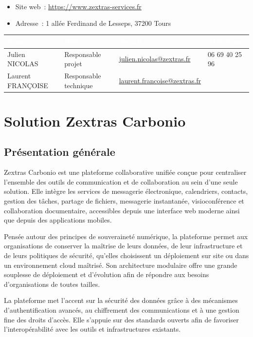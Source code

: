 \documentclass[11pt,a4paper]{report}
\newcommand{\tblhead}[1]{\textcolor{white}{\textbf{#1}}}
\begin{document}
\begin{itemize}[nosep]
  \item Site web~: \url{https://www.zextras-services.fr }
  \item Adresse~: 1 allée Ferdinand de Lesseps, 37200 Tours
\end{itemize}

\begin{longtable}{|p{3cm}|p{3cm}|p{4.3cm}|p{2.7cm}|}
\hline
\rowcolor{primary}\tblhead{Nom} & \tblhead{Rôle} & \tblhead{E-mail} & \tblhead{Téléphone} \\
\hline
\endhead
Julien NICOLAS & Responsable projet & \href{mailto:julien.nicolas@zextras.fr}{julien.\allowbreak{}nicolas@\allowbreak{}zextras.\allowbreak{}fr} & 06 69 40 25 96 \\
\hline
Laurent FRANÇOISE & Responsable technique & \href{mailto:laurent.francoise@zextras.fr}{laurent.\allowbreak{}francoise@\allowbreak{}zextras.\allowbreak{}fr} &  \\
\hline
\end{longtable}


\chapter{Solution Zextras Carbonio}

\section{Présentation générale}
Zextras Carbonio est une plateforme collaborative unifiée conçue pour centraliser l'ensemble des outils de communication et de collaboration au sein d'une seule solution. Elle intègre les services de messagerie électronique, calendriers, contacts, gestion des tâches, partage de fichiers, messagerie instantanée, visioconférence et collaboration documentaire, accessibles depuis une interface web moderne ainsi que depuis des applications mobiles.

Pensée autour des principes de souveraineté numérique, la plateforme permet aux organisations de conserver la maîtrise de leurs données, de leur infrastructure et de leurs politiques de sécurité, qu'elles choisissent un déploiement sur site ou dans un environnement cloud maîtrisé. Son architecture modulaire offre une grande souplesse de déploiement et d'évolution afin de répondre aux besoins d'organisations de toutes tailles.

La plateforme met l'accent sur la sécurité des données grâce à des mécanismes d'authentification avancés, au chiffrement des communications et à une gestion fine des droits d'accès. Elle s'appuie sur des standards ouverts afin de favoriser l'interopérabilité avec les outils et infrastructures existants.
\end{document}
